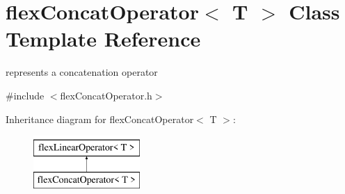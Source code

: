 \hypertarget{classflex_concat_operator}{}\section{flex\+Concat\+Operator$<$ T $>$ Class Template Reference}
\label{classflex_concat_operator}


represents a concatenation operator  




{\ttfamily \#include $<$flex\+Concat\+Operator.\+h$>$}

Inheritance diagram for flex\+Concat\+Operator$<$ T $>$\+:\begin{figure}[H]
\begin{center}
\leavevmode
\includegraphics[height=2.000000cm]{classflex_concat_operator}
\end{center}
\end{figure}
